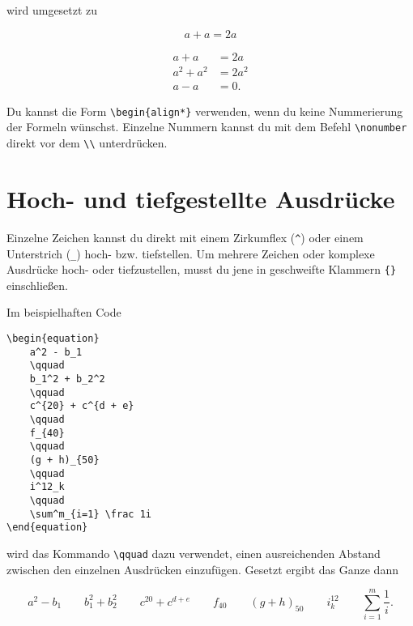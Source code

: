 wird umgesetzt zu

\begin{equation}
	a + a = 2a
\end{equation}

\begin{align}
	    a + a &= 2a \\
	a^2 + a^2 &= 2a^2 \\
	    a - a &= 0.
\end{align}

Du kannst die Form \texttt{\textbackslash begin\{align*\}} verwenden, wenn du keine Nummerierung der Formeln wünschst. Einzelne Nummern kannst du mit dem Befehl \texttt{\textbackslash nonumber} direkt vor dem \texttt{\textbackslash \textbackslash } unterdrücken.

\section{Hoch- und tiefgestellte Ausdrücke}

Einzelne Zeichen kannst du direkt mit einem Zirkumflex (\texttt{\^}) oder einem Unterstrich (\texttt{\_}) hoch- bzw. tiefstellen. Um mehrere Zeichen oder komplexe Ausdrücke hoch- oder tiefzustellen, musst du jene in geschweifte Klammern \texttt{\{\}} %
einschließen.


Im beispielhaften Code
\begin{lstlisting}
\begin{equation}
	a^2 - b_1
	\qquad
	b_1^2 + b_2^2 
	\qquad
	c^{20} + c^{d + e} 
	\qquad
	f_{40}
	\qquad
	(g + h)_{50}
	\qquad
	i^12_k
	\qquad
	\sum^m_{i=1} \frac 1i
\end{equation}
\end{lstlisting} 
wird das Kommando \texttt{\textbackslash qquad} dazu verwendet, einen ausreichenden Abstand zwischen den einzelnen Ausdrücken einzufügen. Gesetzt ergibt das Ganze dann

\begin{equation}
	a^2 - b_1
	\qquad
	b_1^2 + b_2^2 
	\qquad
	c^{20} + c^{d + e} 
	\qquad
	f_{40}
	\qquad
	(g + h)_{50}
	\qquad
	i^12_k
	\qquad
	\sum^m_{i=1} \frac 1i.
\end{equation}

